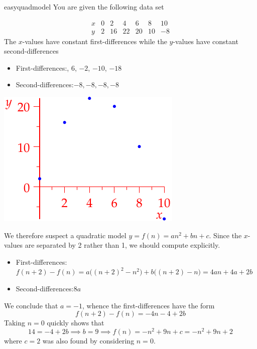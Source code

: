\begin{example}{}{easyquadmodel}
	You are given the following data set\par
	\begin{minipage}[t]{0.65\linewidth}\vspace{-10pt}
		\[
			\begin{array}{c|cccccc}
				x&0&2&4&6&8&10\\\hline
				y&2&16&22&20&10&-8
			\end{array}
		\]
		The $x$-values have constant first-differences while the $y$-values have constant second-differences
		\begin{itemize}
		  \item[]First-differences:, 6, $-2$, $-10$, $-18$
		  \item[]Second-differences:\lstsp $-8,-8,-8,-8$
		\end{itemize}
\end{minipage}
\hfill
\begin{minipage}[t]{0.34\linewidth}\vspace{-10pt}
	\flushright\includegraphics{seqquadex2}
\end{minipage}
\bigbreak

We therefore suspect a quadratic model $y=f(n)=an^2+bn+c$. Since the $x$-values are separated by 2 rather than 1, we should compute explicitly.\footnotemark
\begin{itemize}
  \item[]First-differences:\lstsp $f(n+2)-f(n)=a\bigl((n+2)^2-n^2\bigr)+b\bigl((n+2)-n\bigr) =4an+4a+2b$
  \item[]Second-differences:\lstsp $8a$
\end{itemize}
We conclude that $a=-1$, whence the first-differences have the form
\[
	f(n+2)-f(n)=-4n-4+2b
\]
Taking $n=0$ quickly shows that
\[
	14=-4+2b\implies b=9\implies f(n)=-n^2+9n+c= -n^2+9n+2
\]
where $c=2$ was also found by considering $n=0$.
\end{example}

